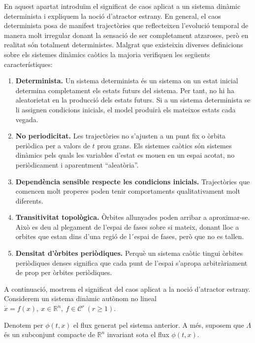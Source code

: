 \documentclass[11pt,a4paper,openright,oneside]{article}
\numberwithin{equation}{section}
\theoremstyle{definition}
\begin{document}
En aquest apartat introduïm el significat de caos aplicat a un sistema dinàmic determinista i expliquem la noció d'atractor estrany. En general, el caos determinista posa de manifest trajectòries que reflecteixen l'evolució temporal de manera molt irregular donant la sensació de ser completament atzaroses, però en realitat són totalment deterministes. Malgrat que existeixin diverses definicions sobre els sistemes dinàmics caòtics la majoria verifiquen les següents característiques:

\begin{enumerate}
    \item \textbf{Determinista.} Un sistema determinista és un sistema on un estat inicial determina completament els estats futurs del sistema. Per tant, no hi ha aleatorietat en la producció dels estats futurs. Si a un sistema determinista se li assignen condicions inicials, el model produirà els mateixos estats cada vegada.

    \item \textbf{No periodicitat.} Les trajectòries no s'ajusten a un punt fix o òrbita periòdica per a valors de $t$ prou grans. Els sistemes caòtics són sistemes dinàmics pels quals les variables d'estat es mouen en un espai acotat, no periòdicament i aparentment “aleatòria”.

    \item \textbf{Dependència sensible respecte les condicions inicials.}  Trajectòries que comencen molt properes poden tenir comportaments qualitativament molt diferents.

     \item \textbf{Transitivitat topològica.} Òrbites allunyades poden arribar a aproximar-se. Això es deu al plegament de l'espai de fases sobre si mateix, donant lloc a orbites que estan dins d'una regió de l´espai de fases, però que no es tallen.
    
    \item \textbf{Densitat d'òrbites periòdiques.} Perquè un sistema caòtic tingui òrbites periòdiques denses significa que cada punt de l'espai s'apropa arbitràriament de prop per òrbites periòdiques. 
\end{enumerate}

A continuació, mostrem el significat del caos aplicat a la noció d'atractor estrany. Considerem un sistema dinàmic autònom no lineal $\dot{x}=f(x), \ x\in \mathbb{R}^n, \ f\in \mathcal{C}^r \ (r\geq 1)$.

Denotem per $\phi(t,x)$ el flux generat pel sistema anterior. A més, suposem que $\Lambda$ és un subconjunt compacte de $\mathbb{R}^n$ invariant sota el flux $\phi(t,x)$.
\end{document}
